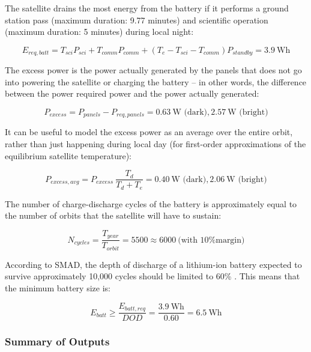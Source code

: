 \documentclass[12pt]{article}
\begin{document}
The satellite drains the most energy from the battery if it performs a ground station pass (maximum duration: 9.77 minutes) and scientific operation (maximum duration: 5 minutes) during local night:

\begin{equation}
E_{req,batt} = T_{sci} P_{sci} + T_{comm} P_{comm} + (T_e - T_{sci} - T_{comm}) P_{standby} = 3.9 \ \text{Wh}
\label{eq:power-batt-req}
\end{equation}

The excess power is the power actually generated by the panels that does not go into powering the satellite or charging the battery -- in other words, the difference between the power required power and the power actually generated:

\begin{equation}
P_{excess} = P_{panels} - P_{req,panels} = 0.63 \ \text{W (dark)}, 2.57 \ \text{W (bright)}
\label{eq:power-excess}
\end{equation}

It can be useful to model the excess power as an average over the entire orbit, rather than just happening during local day (for first-order approximations of the equilibrium satellite temperature):

\begin{equation}
P_{excess,avg} = P_{excess} \: \frac{T_d}{T_d + T_e} = 0.40 \ \text{W (dark)}, 2.06 \ \text{W (bright)}
\label{eq:power-excess-avg}
\end{equation}

The number of charge-discharge cycles of the battery is approximately equal to the number of orbits that the satellite will have to sustain:

\begin{equation}
N_{cycles} = \frac{T_{year}}{T_{orbit}} = 5500 \approx 6000 \ \text{(with 10\% margin)}
\label{eq:power-num-cycles}
\end{equation}

According to SMAD, the depth of discharge of a lithium-ion battery expected to survive approximately 10,000 cycles should be limited to 60\% \cite[p.~651,~Fig.~21-16]{SMAD}.  This means that the minimum battery size is:

\begin{equation}
E_{batt} \geq \frac{E_{batt,req}}{DOD} = \frac{3.9 \ \text{Wh}}{0.60} = 6.5 \ \text{Wh}
\label{eq:power-batt-size}
\end{equation}

			\subsubsection{Summary of Outputs}
			
\end{document}
